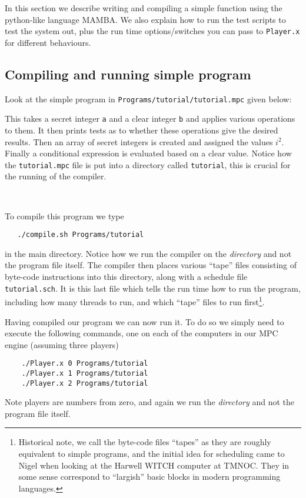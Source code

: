 \label{sec:example}
In this section we describe writing and compiling a simple
function using the python-like language MAMBA.
We also explain how to run the test scripts to test the system
out, plus the run time options/switches you can pass to 
\verb+Player.x+ for different behaviours.

\subsection{Compiling and running simple program}
Look at the simple program in \verb+Programs/tutorial/tutorial.mpc+
given below:


This takes a secret integer \verb+a+ and a clear integer \verb+b+
and applies various operations to them. It then prints tests
as to whether these operations give the desired results.
Then an array of secret integers is created and assigned the
values $i^2$. Finally a conditional expression is evaluated
based on a clear value.
Notice how the \verb+tutorial.mpc+ file is put into a directory
called \verb+tutorial+, this is crucial for the running of
the compiler.

~~

\noindent
To compile this program we type
\begin{verbatim}
   ./compile.sh Programs/tutorial
\end{verbatim}
in the main directory. Notice how we run the compiler on the
{\em directory} and not the program file itself.
The compiler then places various ``tape'' files consisting of 
byte-code instructions into this directory, along with a
schedule file \verb+tutorial.sch+. It is this last file which
tells the run time how to run the program, including how
many threads to run, and which ``tape'' files to run 
first\footnote{Historical note, we call the byte-code files ``tapes''
as they are roughly equivalent to simple programs, and
the initial idea for scheduling came to Nigel when looking at
the Harwell WITCH computer at TMNOC. They in some sense
correspond to ``largish'' basic blocks in modern programming
languages.}.

Having compiled our program we can now run it. To do so
we simply need to execute the following commands, one on
each of the computers in our MPC engine (assuming three players)
\begin{verbatim}
    ./Player.x 0 Programs/tutorial
    ./Player.x 1 Programs/tutorial
    ./Player.x 2 Programs/tutorial
\end{verbatim}
Note players are numbers from zero, and again we run the
{\em directory} and not the program file itself.


